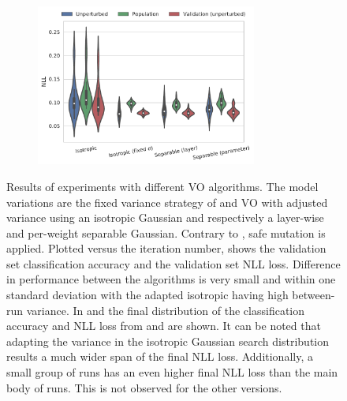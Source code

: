 \begin{figure}[tbp!]
\begin{subfigure}[b]{0.49\textwidth}
        \caption{}
        \label{fig: Theory: E029-VO-S5-MD-analysis/accuracy-final-distribution-boxplot-grouped}
    \end{subfigure}
    \hfill
    \begin{subfigure}[b]{0.49\textwidth}
        \centering
        \includegraphics[height=5.3cm]{graphics/E029-VO-S5-MD-analysis/return-final-distribution-boxplot-grouped.pdf}
        \caption{}
        \label{fig: Theory: E029-VO-S5-MD-analysis/return-final-distribution-boxplot-grouped}
    \end{subfigure}
    \caption{
        Results of experiments with different \gls{VO} algorithms. The model variations are the fixed variance strategy of \cite{Salimans2017} and \gls{VO} with adjusted variance using an isotropic Gaussian and respectively a layer-wise and per-weight separable Gaussian. Contrary to \cite{Salimans2017}, safe mutation is applied.
        Plotted versus the iteration number,  shows the validation set classification accuracy and  the validation set \gls{NLL} loss. 
        Difference in performance between the algorithms is very small and within one standard deviation with the adapted isotropic having high between-run variance.
        In  and  the final distribution of the classification accuracy and \gls{NLL} loss from  and  are shown. It can be noted that adapting the variance in the isotropic Gaussian search distribution results a much wider span of the final \gls{NLL} loss. Additionally, a small group of runs has an even higher final \gls{NLL} loss than the main body of runs. This is not observed for the other versions.
    }
    \label{fig: Theory: E029-VO-S5-MD-analysis}
\end{figure}


